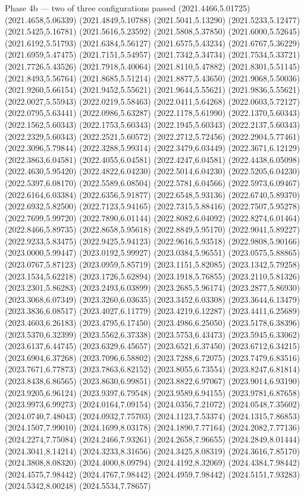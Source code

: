 \documentclass[aspectratio=169,10pt]{beamer}
\begin{document}
\begin{frame}[t]{Phase 4b — two of three configurations passed}
(2021.4466,5.01725) (2021.4658,5.06339) (2021.4849,5.10788) (2021.5041,5.13290) (2021.5233,5.12477) (2021.5425,5.16781) (2021.5616,5.23592) (2021.5808,5.37850) (2021.6000,5.52645) (2021.6192,5.51793) (2021.6384,5.56127) (2021.6575,5.43234) (2021.6767,5.36229) (2021.6959,5.47475) (2021.7151,5.54957) (2021.7342,5.34734) (2021.7534,5.33721) (2021.7726,5.43526) (2021.7918,5.40064) (2021.8110,5.47882) (2021.8301,5.51145) (2021.8493,5.56764) (2021.8685,5.51214) (2021.8877,5.43650) (2021.9068,5.50036) (2021.9260,5.66154) (2021.9452,5.55621) (2021.9644,5.55621) (2021.9836,5.55621) (2022.0027,5.55943) (2022.0219,5.58463) (2022.0411,5.64268) (2022.0603,5.72127) (2022.0795,5.63441) (2022.0986,5.63287) (2022.1178,5.61990) (2022.1370,5.60343) (2022.1562,5.60343) (2022.1753,5.60343) (2022.1945,5.60343) (2022.2137,5.60343) (2022.2329,5.60343) (2022.2521,5.60572) (2022.2712,5.72456) (2022.2904,5.77461) (2022.3096,5.79844) (2022.3288,5.99314) (2022.3479,6.03449) (2022.3671,6.12129) (2022.3863,6.04581) (2022.4055,6.04581) (2022.4247,6.04581) (2022.4438,6.05098) (2022.4630,5.95420) (2022.4822,6.04230) (2022.5014,6.04230) (2022.5205,6.04230) (2022.5397,6.08170) (2022.5589,6.08504) (2022.5781,6.04566) (2022.5973,6.09467) (2022.6164,6.03384) (2022.6356,5.91877) (2022.6548,5.93136) (2022.6740,5.89370) (2022.6932,5.82500) (2022.7123,5.94165) (2022.7315,5.88416) (2022.7507,5.95278) (2022.7699,5.99720) (2022.7890,6.01144) (2022.8082,6.04092) (2022.8274,6.01464) (2022.8466,5.89735) (2022.8658,5.95618) (2022.8849,5.95170) (2022.9041,5.89227) (2022.9233,5.83475) (2022.9425,5.94123) (2022.9616,5.93518) (2022.9808,5.90166) (2023.0000,5.99447) (2023.0192,5.99927) (2023.0384,5.96551) (2023.0575,5.88865) (2023.0767,5.87123) (2023.0959,5.85719) (2023.1151,5.82085) (2023.1342,5.79258) (2023.1534,5.62218) (2023.1726,5.62894) (2023.1918,5.76855) (2023.2110,5.81326) (2023.2301,5.86283) (2023.2493,6.03899) (2023.2685,5.96174) (2023.2877,5.86930) (2023.3068,6.07349) (2023.3260,6.03635) (2023.3452,6.03308) (2023.3644,6.13479) (2023.3836,6.08517) (2023.4027,6.11779) (2023.4219,6.12287) (2023.4411,6.25689) (2023.4603,6.26183) (2023.4795,6.17450) (2023.4986,6.25050) (2023.5178,6.38396) (2023.5370,6.32399) (2023.5562,6.37338) (2023.5753,6.43473) (2023.5945,6.33062) (2023.6137,6.44745) (2023.6329,6.45657) (2023.6521,6.37450) (2023.6712,6.34215) (2023.6904,6.37268) (2023.7096,6.58802) (2023.7288,6.72075) (2023.7479,6.83516) (2023.7671,6.77873) (2023.7863,6.82152) (2023.8055,6.73554) (2023.8247,6.81814) (2023.8438,6.86565) (2023.8630,6.99851) (2023.8822,6.97067) (2023.9014,6.93190) (2023.9205,6.96124) (2023.9397,6.79548) (2023.9589,6.94155) (2023.9781,6.87658) (2023.9973,6.99273) (2024.0164,7.09154) (2024.0356,7.21072) (2024.0548,7.35602) (2024.0740,7.48043) (2024.0932,7.75703) (2024.1123,7.53374) (2024.1315,7.86853) (2024.1507,7.99010) (2024.1699,8.03178) (2024.1890,7.77164) (2024.2082,7.77136) (2024.2274,7.75084) (2024.2466,7.93261) (2024.2658,7.96655) (2024.2849,8.01444) (2024.3041,8.14214) (2024.3233,8.31656) (2024.3425,8.08319) (2024.3616,7.85170) (2024.3808,8.08320) (2024.4000,8.09794) (2024.4192,8.32069) (2024.4384,7.98442) (2024.4575,7.98442) (2024.4767,7.98442) (2024.4959,7.98442) (2024.5151,7.93283) (2024.5342,8.00248) (2024.5534,7.78657) 
\end{frame}
\end{document}
